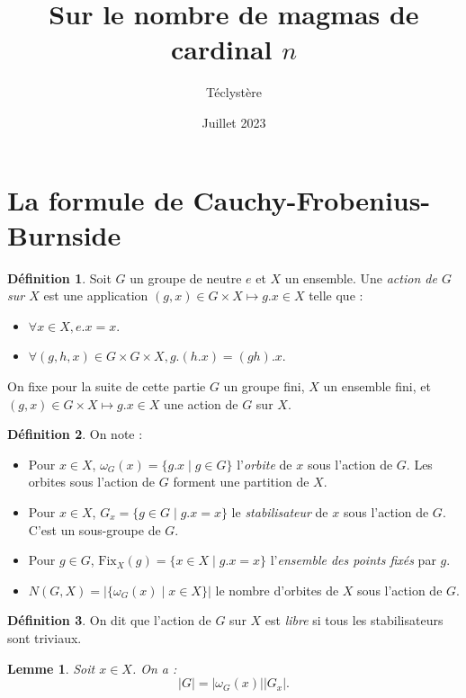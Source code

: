 \documentclass{article}
\title{Sur le nombre de magmas de cardinal $n$}
\author{Téclystère}
\date{Juillet 2023}
\newtheorem*{lemme}{Lemme}
\theoremstyle{definition}
\newtheorem*{definition}{Définition}
\theoremstyle{remark}
\begin{document}
\maketitle

\section{La formule de Cauchy-Frobenius-Burnside}

\begin{definition}
    Soit $G$ un groupe de neutre $e$ et $X$ un ensemble. Une \textit{action de $G$ sur $X$} est une application $(g,x)\in G\times X \mapsto g.x\in X$ telle que :
    \begin{itemize}
        \item $\forall x\in X, e.x=x$.
        \item $\forall (g,h,x)\in G\times G\times X, g.(h.x)=(gh).x$.
    \end{itemize}
\end{definition}

On fixe pour la suite de cette partie $G$ un groupe fini, $X$ un ensemble fini, et $(g,x)\in G\times X \mapsto g.x\in X$ une action de $G$ sur $X$.

\begin{definition}
    On note :
    \begin{itemize}
        \item Pour $x\in X$, $\omega_G(x)=\{g.x\mid g\in G\}$ l'\textit{orbite} de $x$ sous l'action de $G$. Les orbites sous l'action de $G$ forment une partition de $X$.
        \item Pour $x\in X$, $G_x=\{g\in G\mid g.x=x\}$ le \textit{stabilisateur} de $x$ sous l'action de $G$. C'est un sous-groupe de $G$.
        \item Pour $g\in G$, $\mathrm{Fix}_X(g)=\{x\in X\mid g.x=x\}$ l'\textit{ensemble des points fixés} par $g$.
        \item $N(G,X)=|\{\omega_G(x)\mid x\in X\}|$ le nombre d'orbites de $X$ sous l'action de $G$.
    \end{itemize}
\end{definition}

\begin{definition}
    On dit que l'action de $G$ sur $X$ est \textit{libre} si tous les stabilisateurs sont triviaux.
\end{definition}

\begin{lemme}
    Soit $x\in X$. On a :
    $$|G|=|\omega_G(x)||G_x|.$$
\end{lemme}
\end{document}
